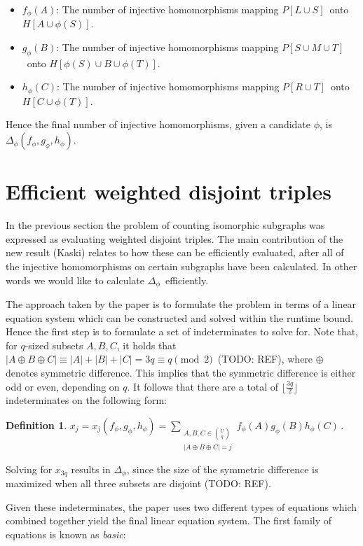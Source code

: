 \documentclass[a4paper,11pt]{report}
\theoremstyle{plain}
\theoremstyle{definition}
\newtheorem{defn}[thm]{Definition} %
\begin{document}
\begin{itemize}
\item $f_\phi(A)$: The number of injective homomorphisms mapping $P[L \cup S]$ onto $H[A \cup \phi(S)]$.
\item $g_\phi(B)$: The number of injective homomorphisms mapping $P[S \cup M \cup T]$ onto $H[\phi(S) \cup B \cup \phi(T)]$.
\item $h_\phi(C)$: The number of injective homomorphisms mapping $P[R \cup T]$ onto $H[C \cup \phi(T)]$.
\end{itemize}

Hence the final number of injective homomorphisms, given a candidate $\phi$, is $\Delta_\phi(f_\phi, g_\phi, h_\phi)$.

\section{Efficient weighted disjoint triples}
In the previous section the problem of counting isomorphic subgraphs was expressed as evaluating weighted disjoint triples.
The main contribution of the new result (Kaski) relates to how these can be efficiently evaluated, after all of the
injective homomorphisms on certain subgraphs have been calculated.
In other words we would like to calculate $\Delta_\phi$ efficiently.

The approach taken by the paper is to formulate the problem in terms of a linear equation system which can be constructed and solved within the runtime bound.
Hence the first step is to formulate a set of indeterminates to solve for.
Note that, for $q$-sized subsets $A,B,C$, it holds that $|A\oplus B\oplus C|\equiv |A|+|B|+|C|=3q\equiv q\pmod 2\,$ (TODO: REF), where $\oplus$ denotes symmetric difference.
This implies that the symmetric difference is either odd or even, depending on $q$.
It follows that there are a total of $\lfloor \frac{3q}{2} \rfloor$ indeterminates on the following form:

\begin{defn}
$x_j=x_j(f_\phi,g_\phi,h_\phi)=\sum_{\substack{A,B,C\in\binom{U}{q}\\|A\oplus B\oplus C|=j}}
f_{\phi}(A)g_{\phi}(B)h_{\phi}(C)\,.$
\end{defn}

Solving for $x_{3q}$ results in $\Delta_\phi$, since the size of the symmetric difference is maximized when all three subsets are disjoint (TODO: REF). 

Given these indeterminates, the paper uses two different types of equations which combined together yield the final linear equation system.
The first family of equations is known as \emph{basic}:
\end{document}
